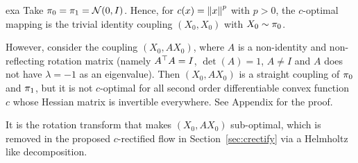 \begin{theoremEnd}{exa}
\label{exa:toycounterexp}                   
Take $\tg_0 = \tg_1 = \normal(0,I)$. 
Hence, for $c(x)=\norm{x}^p$ with $p>0$, 
the $c$-optimal mapping is the trivial identity coupling $(X_0,X_0)$ with $X_0\sim \tg_0$. 

However, 
consider the coupling $(X_0,AX_0)$, 
where $A$ is a 
 non-identity and non-reflecting rotation matrix (namely $A\tt A=I$, $\det(A)=1$, $A \neq I$ and $A$ does not have $\lambda =-1$ as an eigenvalue).  
Then $ (X_0, A X_0)$ is a straight coupling of $\tg_0$ and $\tg_1$, 
but it is not $c$-optimal for all 
second order differentiable convex function $c$ whose Hessian matrix is invertible everywhere. {See Appendix for the proof.}

It is the rotation transform
that makes $(X_0,AX_0)$ sub-optimal, 
which is removed in the proposed $c$-rectified flow in Section~\ref{sec:crectify} via a Helmholtz like decomposition. 
\end{theoremEnd} 
